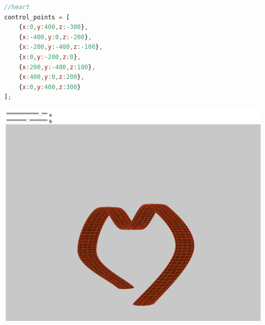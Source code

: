 \begin{lstlisting}[language=Javascript]
//heart
control_points = [
    {x:0,y:400,z:-300},
    {x:-400,y:0,z:-200},
    {x:-200,y:-400,z:-100},
    {x:0,y:-200,z:0},
    {x:200,y:-400,z:100},
    {x:400,y:0,z:200},
    {x:0,y:400,z:300}
];
\end{lstlisting}

\includegraphics[scale=0.35]{pictures/5.png}